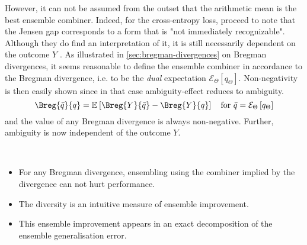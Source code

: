 \documentclass[../main.tex]{subfiles}
\begin{document}
However, it can not be assumed from the outset that the arithmetic mean is the best ensemble combiner. Indeed, for the cross-entropy loss, \citeauthor{abe} proceed to note that the Jensen gap corresponds to a form that is "not immediately recognizable". Although they do find an interpretation of it, it is still necessarily dependent on the outcome $Y$ 
.
As illustrated in \ref{sec:bregman-divergences} on Bregman divergences, 
it seems reasonable to define the ensemble combiner in accordance to the Bregman divergence, i.e. to be the \textit{dual} expectation $\mathcal{E}_{\Theta}\left[ q_{\Theta} \right]$. 
Non-negativity is then easily shown since in that case ambiguity-effect reduces to ambiguity.
$$
\Breg{\bar{q}}{q} = \mathbb{E}_{}\left[ \Breg{Y}{\bar{q}} - \Breg{Y}{q} \right]
\hspace{1em} \text{for $\bar{q} = \mathcal{E}_\Theta\left[q_\Theta\right]$}
$$ and the value of any Bregman divergence is always non-negative. Further, ambiguity is now independent of the outcome $Y$.

\begin{corollary} ~ ~ 
    \label{cor:bregman-divergences}
    \begin{itemize}
        \item For any Bregman divergence, ensembling using the combiner implied by the divergence can not hurt performance.
        \item The diversity is an intuitive measure of ensemble improvement.
        \item This ensemble improvement appears in an exact decomposition of the ensemble generalisation error.
    \end{itemize}
\end{corollary}


\end{document}
